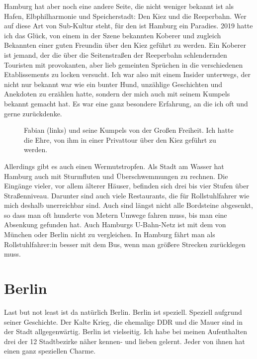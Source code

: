 \documentclass[fontsize=14pt,a4paper,headinclude,DIV=calc,automark]{scrbook}
\begin{document}
Hamburg hat aber noch eine andere Seite, die nicht weniger bekannt ist als Hafen, Elbphilharmonie und Speicherstadt: Den Kiez und die Reeperbahn. Wer auf diese Art von Sub-Kultur steht, für den ist Hamburg ein Paradies. 2019 hatte ich das Glück, von einem in der Szene bekannten Koberer und zugleich Bekannten einer guten Freundin über den Kiez geführt zu werden. Ein Koberer ist jemand, der die über die Seitenstraßen der Reeperbahn schlendernden Touristen mit provokanten, aber lieb gemeinten Sprüchen in die verschiedenen Etablissements zu locken versucht. Ich war also mit einem Insider unterwegs, der nicht nur bekannt war wie ein bunter Hund, unzählige Geschichten und Anekdoten zu erzählen hatte, sondern der mich auch mit seinem Kumpels bekannt gemacht hat. Es war eine ganz besondere Erfahrung, an die ich oft und gerne zurückdenke.

\setlength{\fboxsep}{0pt}    %
\setlength{\fboxrule}{0.2pt} %
\begin{figure}[ht]
    \raggedright
    \caption{Fabian (links) und seine Kumpels von der Großen Freiheit. Ich hatte die Ehre, von ihm in einer Privattour über den Kiez geführt zu werden.}
    \label{fig:hamburg}
\end{figure}

Allerdings gibt es auch einen Wermutstropfen. Als Stadt am Wasser hat Hamburg auch mit Sturmfluten und Überschwemmungen zu rechnen. Die Eingänge vieler, vor allem älterer Häuser, befinden sich drei bis vier Stufen über Straßenniveau. Darunter sind auch viele Restaurants, die für Rollstuhlfahrer wie mich deshalb unerreichbar sind. Auch sind längst nicht alle Bordsteine abgesenkt, so dass man oft hunderte von Metern Umwege fahren muss, bis man eine Absenkung gefunden hat. Auch Hamburgs U-Bahn-Netz ist mit dem von München oder Berlin nicht zu vergleichen. In Hamburg fährt man als Rollstuhlfahrer:in besser mit dem Bus, wenn man größere Strecken zurücklegen muss.

\section{Berlin}

Last but not least ist da natürlich Berlin. Berlin ist speziell. Speziell aufgrund seiner Geschichte. Der Kalte Krieg, die ehemalige DDR und die Mauer sind in der Stadt allgegenwärtig. Berlin ist vielseitig. Ich habe bei meinen Aufenthalten drei der 12 Stadtbezirke näher kennen- und lieben gelernt. Jeder von ihnen hat einen ganz speziellen Charme.
\end{document}
